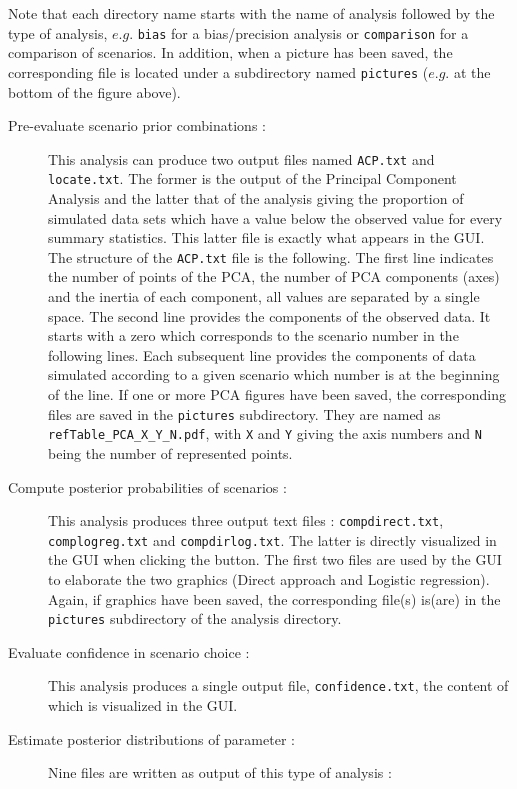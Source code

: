 Note that each directory name starts with the name of analysis followed by the type of analysis, $e.g.$ \texttt{bias} for a bias/precision analysis or \texttt{comparison} for a comparison of scenarios. In addition, when a picture has been saved, the corresponding file is located under a subdirectory named \texttt{pictures} ($e.g.$ at the bottom of the figure above).
\begin{description}
 \item [Pre-evaluate scenario prior combinations :] This analysis can produce two output files named \texttt{ACP.txt} and \texttt{locate.txt}. The former is the output of the Principal Component Analysis and the latter that of the analysis giving the proportion of simulated data sets which have a value below the observed value for every summary statistics. This latter file is exactly what appears in the GUI. The structure of the  \texttt{ACP.txt} file is the following. The first line indicates the number of points of the PCA, the number of PCA components (axes) and the inertia of each component, all values are separated by a single space. The second line provides the components of the observed data. It starts with a zero which corresponds to the scenario number in the following lines. Each subsequent line provides the components of data simulated according to a given scenario which number is at the beginning of the line. If one or more PCA figures have been saved, the corresponding files are saved in the \texttt{pictures} subdirectory. They are named as \texttt{refTable\_PCA\_X\_Y\_N.pdf}, with \texttt{X} and  \texttt{Y} giving the axis numbers and \texttt{N} being the number of represented points. 
 \item [Compute posterior probabilities of scenarios :] This analysis produces three output text files : \texttt{compdirect.txt}, \texttt{complogreg.txt} and \texttt{compdirlog.txt}. The latter is directly visualized in the GUI when clicking the  button. The first two files are used by the GUI to elaborate the two graphics (Direct approach and Logistic regression). Again, if graphics have been saved, the corresponding file(s) is(are) in the \texttt{pictures} subdirectory of the analysis directory.  
 \item [Evaluate confidence in scenario choice :] This analysis produces a single output file, \texttt{confidence.txt}, the content of which is visualized in the GUI.
 \item [Estimate posterior distributions of parameter :] Nine files are written as output of this type of analysis :

\end{description}
